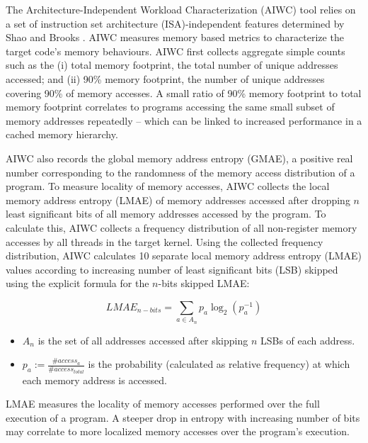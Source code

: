 \documentclass[review=false, sigchi]{acmart}
\begin{document}
	The Architecture-Independent Workload Characterization (AIWC) tool \cite{beauaiwc} relies on a set of instruction set architecture (ISA)-independent features determined by Shao and Brooks \cite{shao2013isa}. AIWC measures memory based metrics to characterize the target code's memory behaviours. AIWC first collects aggregate simple counts such as the (i) total memory footprint, the total number of unique addresses accessed; and (ii) 90\% memory footprint, the number of unique addresses covering 90\% of memory accesses. A small ratio of 90\% memory footprint to total memory footprint correlates to programs accessing the same small subset of memory addresses repeatedly -- which can be linked to increased performance in a cached memory hierarchy.
	
	AIWC also records the global memory address entropy (GMAE), a positive real number corresponding to the randomness of the memory access distribution of a program. To measure locality of memory accesses, AIWC collects the local memory address entropy (LMAE) of memory addresses accessed after dropping $n$ least significant bits of all memory addresses accessed by the program. To calculate this, AIWC collects a frequency distribution of all non-register memory accesses by all threads in the target kernel. Using the collected frequency distribution, AIWC calculates 10 separate local memory address entropy (LMAE) values according to increasing number of least significant bits (LSB) skipped using
	the explicit formula for the $n$-bits skipped LMAE:
	
	\begin{equation}
	LMAE_{n-bits} = \sum_{a \in A_n}p_a \log_2(p_a^{-1})
	\end{equation}
	
	\begin{itemize}
		\item $A_n$ is the set of all addresses accessed after skipping $n$ LSBs of each address.
		\item $p_a := \frac{\#access_a}{\#access_{total}}$ is the probability (calculated as relative frequency) at which each memory address is accessed.
	\end{itemize}
	
	LMAE measures the locality of memory accesses performed over the full execution of a program. A steeper drop in entropy with increasing number of bits may correlate to more localized memory accesses over the program's execution.
	
\end{document}
